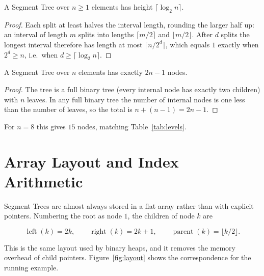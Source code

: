 \begin{lem}[Height]\label{lem:height}
A Segment Tree over $n\ge 1$ elements has height $\lceil \log_2 n\rceil$.
\end{lem}
\begin{proof}
Each split at least halves the interval length, rounding the larger half up: an interval of length $m$ splits into lengths $\lceil m/2\rceil$ and $\lfloor m/2\rfloor$. After $d$ splits the longest interval therefore has length at most $\lceil n/2^{d}\rceil$, which equals $1$ exactly when $2^d\ge n$, i.e.\ when $d\ge\lceil\log_2 n\rceil$.
\end{proof}

\begin{lem}\label{lem:nodes}
A Segment Tree over $n$ elements has exactly $2n-1$ nodes.
\end{lem}
\begin{proof}
The tree is a full binary tree (every internal node has exactly two children) with $n$ leaves. In any full binary tree the number of internal nodes is one less than the number of leaves, so the total is $n+(n-1)=2n-1$.
\end{proof}

For $n=8$ this gives $15$ nodes, matching Table~\ref{tab:levels}.

\section{Array Layout and Index Arithmetic}
Segment Trees are almost always stored in a flat array rather than with explicit pointers. Numbering the root as node $1$, the children of node $k$ are

\begin{equation}
\operatorname{left}(k) = 2k, \qquad \operatorname{right}(k) = 2k+1, \qquad \operatorname{parent}(k)=\lfloor k/2\rfloor.
\label{eq:heap}
\end{equation}

This is the same layout used by binary heaps, and it removes the memory overhead of child pointers. Figure~\ref{fig:layout} shows the correspondence for the running example.

